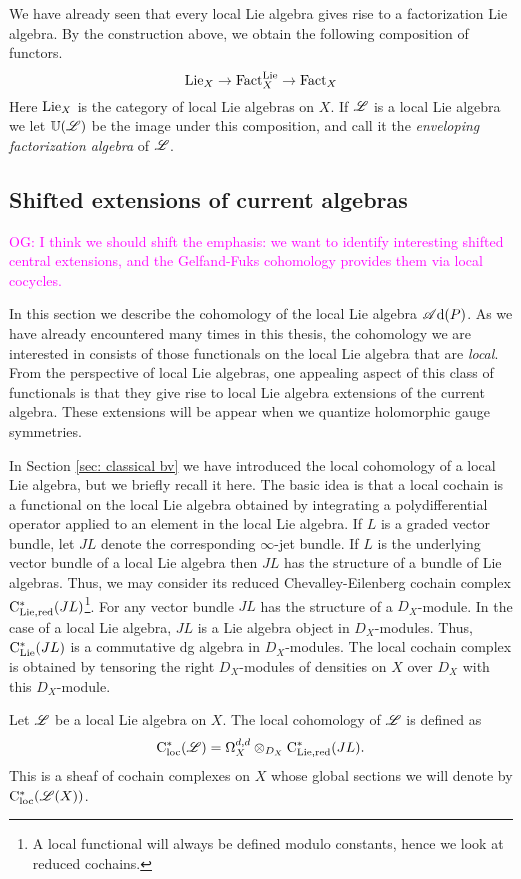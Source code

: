 \documentclass[10pt]{amsart}
\def\sAd{\sA{\rm d}}
\def\owen{\textcolor{magenta}{OG: }\textcolor{magenta}}
\begin{document}
We have already seen that every local Lie algebra gives rise to a factorization Lie algebra.
By the construction above, we obtain the following composition of functors.
\[
{\rm Lie}_X \to {\rm Fact}^{\rm Lie}_X \to {\rm Fact}_X
\]
Here ${\rm Lie}_X$ is the category of local Lie algebras on $X$.
If $\mathscr L$ is a local Lie algebra we let $\mathbb U(\mathscr L)$ be the image under this composition, and call it the {\em enveloping factorization algebra} of $\mathscr L$. 

\subsection{Shifted extensions of current algebras}

\owen{I think we should shift the emphasis: we want to identify interesting shifted central extensions, and the Gelfand-Fuks cohomology provides them via local cocycles.}

In this section we describe the cohomology of the local Lie algebra $\sAd(P)$.
As we have already encountered many times in this thesis, the cohomology we are interested in consists of those functionals on the local Lie algebra that are {\em local}.
From the perspective of local Lie algebras, one appealing aspect of this class of functionals is that they give rise to local Lie algebra extensions of the current algebra.
These extensions will be appear when we quantize holomorphic gauge symmetries.

In Section \ref{sec: classical bv} we have introduced the local cohomology of a local Lie algebra, but we briefly recall it here.
The basic idea is that a local cochain is a functional on the local Lie algebra obtained by integrating a polydifferential operator applied to an element in the local Lie algebra.
If $L$ is a graded vector bundle, let $JL$ denote the corresponding $\infty$-jet bundle. 
If $L$ is the underlying vector bundle of a local Lie algebra then $JL$ has the structure of a bundle of Lie algebras.
Thus, we may consider its reduced Chevalley-Eilenberg cochain complex ${\rm C}_{\rm Lie, red}^*(JL)$\footnote{A local functional will always be defined modulo constants, hence we look at reduced cochains.}.
For any vector bundle $JL$ has the structure of a $D_X$-module.
In the case of a local Lie algebra, $JL$ is a Lie algebra object in $D_X$-modules.
Thus, ${\rm C}_{{\rm Lie}}^*(JL)$ is a commutative dg algebra in $D_X$-modules. 
The local cochain complex is obtained by tensoring the right $D_X$-modules of densities on $X$ over $D_X$ with this $D_X$-module.

\begin{dfn}
Let $\mathscr L$ be a local Lie algebra on $X$.
The local cohomology of $\mathscr L$ is defined as
\[
{\rm C}_{\rm loc}^*(\mathscr L) = \Omega^{d,d}_X \otimes_{D_X} {\rm C}_{\rm Lie, red}^*(J L) .
\]
This is a sheaf of cochain complexes on $X$ whose global sections we will denote by ${\rm C}_{\rm loc}^*(\mathscr L(X))$.
\end{dfn}
\end{document}
